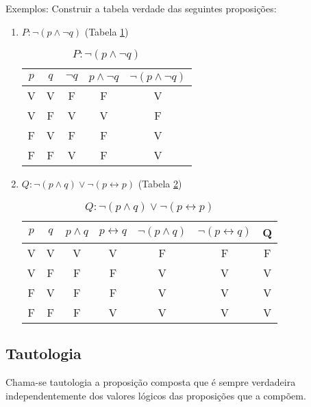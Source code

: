 Exemplos: Construir a tabela verdade das seguintes proposições:
\begin{enumerate}
\item $P:\neg(p\wedge\neg q)$ (Tabela \ref{1})
\begin{table}[h]
   \centering
   \setlength{\arrayrulewidth}{0,5\arrayrulewidth}
   \caption{\it $P:\neg(p\wedge\neg q)$}
   \begin{tabular}{|c|c|c|c|c|}
      \hline
      $p$ & $q$ & $\neg q$ & $p\wedge\neg q$ & $\neg(p\wedge\neg q)$ \\
     \hline
      V & V & F & F & V \\
      \hline
      V & F & V & V & F \\
      \hline
      F & V & F & F & V \\
      \hline
      F & F & V & F & V \\
      \hline
   \end{tabular}
\label{1}
\end{table}
\item $Q:\neg(p\wedge q)\vee\neg(p\leftrightarrow p)$ (Tabela \ref{2})
\begin{table}[h]
   \centering
   \setlength{\arrayrulewidth}{0,5\arrayrulewidth}
   \caption{\it $Q:\neg(p\wedge q)\vee\neg(p\leftrightarrow p)$}
   \begin{tabular}{|c|c|c|c|c|c|c|}
      \hline
      $p$ & $q$ & $p\wedge q$ & $p\leftrightarrow q$ & $\neg(p\wedge q)$ & $\neg(p\leftrightarrow q)$ & Q \\
     \hline
      V & V & V & V & F & F & F \\
      \hline
      V & F & F & F & V & V & V\\
      \hline
      F & V & F & F & V & V & V \\
      \hline
      F & F & F & V & V & V & V \\
      \hline
   \end{tabular}
\label{2}
\end{table}
\end{enumerate}

\subsection{Tautologia}
\begin{definicao}[Tautologia] Chama-se tautologia a proposição composta que é sempre verdadeira independentemente dos valores lógicos das proposições que a comp{\~o}em.\end{definicao}

